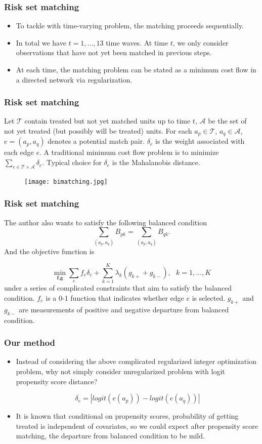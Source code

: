 \documentclass[10pt, handout]{beamer} %
\begin{document}
\frame
{
\frametitle{Risk set matching}
\vskip 0.1in
\begin{itemize}

\item To tackle with time-varying problem, the matching proceeds sequentially. 

\vskip 0.1in

\item In total we have $t=1,\dots,13$ time waves. At time $t$, we only consider observations that have not yet been matched in previous steps. 

\vskip 0.1in

\item At each time, the matching problem can be stated as a minimum cost flow in a directed network via regularization.
\end{itemize}
}

\frame
{
\frametitle{Risk set matching}
\vskip 0.1in  

Let $\mathcal{T}$ contain  treated but not yet matched units up to time $t$, $\mathcal{A}$ be the set of not yet treated (but possibly will be treated) units. For each $a_p\in\mathcal{T}$, $a_q\in\mathcal{A}$, $e=(a_p, a_q)$ denotes a potential match pair. $\delta_{e}$ is the weight associated with each edge $e$. A traditional minimum cost flow problem is to minimize $\sum_{e\in\mathcal{T}\times\mathcal{A}} \delta_{e}$. Typical choice for $\delta_{e}$ is the Mahalanobis distance.

\begin{figure}[!ht]
\centering
\texttt{[image: bimatching.jpg]}
\end{figure}

}

\frame
{
\frametitle{Risk set matching}
\vskip 0.1in  

The author also wants to satisfy the following balanced condition $$\sum_{(a_p, a_q)} B_{pk}=\sum_{(a_p, a_q)} B_{qk}.$$ And the objective function is

$$\min_{\textbf{f},\textbf{g}}\sum_{e}f_e\delta_e+\sum_{k=1}^K \lambda_k(g_{k+}+g_{k-}), \text{ } k=1,\dots,K$$
under a series of complicated constraints that aim to satisfy the balanced condition. $f_e$ is a 0-1 function that indicates whether edge $e$ is selected. $g_{k+}$ and $g_{k-}$ are measurements of positive and negative departure from balanced condition.
}

\frame
{
\frametitle{Our method}
\vskip 0.1in
\begin{itemize}

\item Instead of considering the above complicated regularized integer optimization problem, why not simply consider unregularized problem with logit propensity score distance? 

$$\delta_e=|logit(e(a_p))-logit(e(a_q))|$$

\vskip 0.1in

\item It is known that conditional on propensity scores, probability of getting treated is independent of covariates, so we could expect after propensity score matching, the departure from balanced condition to be mild.

\end{itemize}
}
\end{document}
